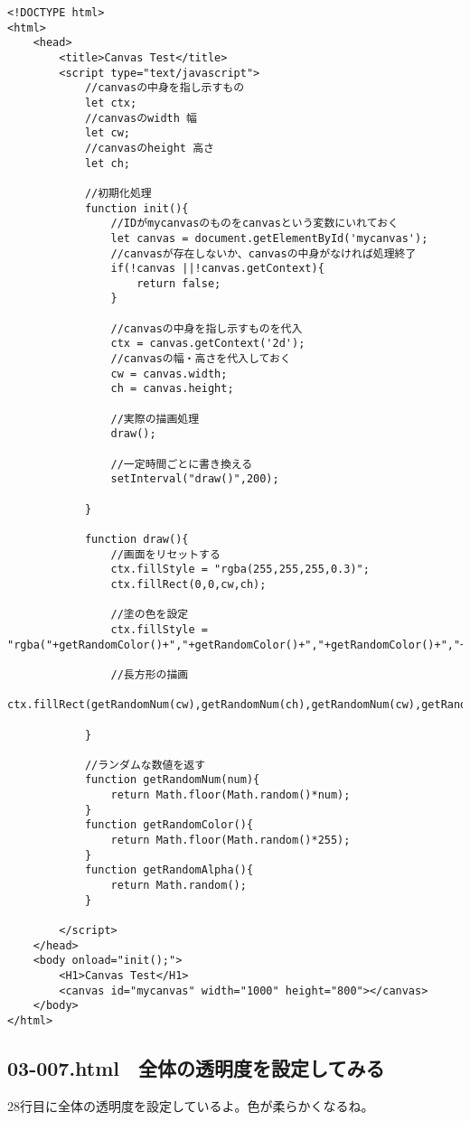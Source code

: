 \documentclass[mingoth,11pt,a4j,uplatex]{jsarticle}
\begin{document}
\begin{lstlisting}[caption=一定時間ごとにランダムな長方形を追加しよう]
<!DOCTYPE html>
<html>
	<head>
		<title>Canvas Test</title>
		<script type="text/javascript">
			//canvasの中身を指し示すもの
			let ctx;
			//canvasのwidth 幅
			let cw;
			//canvasのheight 高さ
			let ch;
			
			//初期化処理
			function init(){
				//IDがmycanvasのものをcanvasという変数にいれておく
				let canvas = document.getElementById('mycanvas');
				//canvasが存在しないか、canvasの中身がなければ処理終了
				if(!canvas ||!canvas.getContext){
					return false;
				}
				
				//canvasの中身を指し示すものを代入
				ctx = canvas.getContext('2d');
				//canvasの幅・高さを代入しておく
				cw = canvas.width;
				ch = canvas.height;
				
				//実際の描画処理
				draw();
				
				//一定時間ごとに書き換える
				setInterval("draw()",200);

			}
			
			function draw(){
				//画面をリセットする
				ctx.fillStyle = "rgba(255,255,255,0.3)";
				ctx.fillRect(0,0,cw,ch);
				
				//塗の色を設定
				ctx.fillStyle = "rgba("+getRandomColor()+","+getRandomColor()+","+getRandomColor()+","+getRandomAlpha()+")";
				
				//長方形の描画
				ctx.fillRect(getRandomNum(cw),getRandomNum(ch),getRandomNum(cw),getRandomNum(ch));

			}
			
			//ランダムな数値を返す
			function getRandomNum(num){
				return Math.floor(Math.random()*num);
			}
			function getRandomColor(){
				return Math.floor(Math.random()*255);
			}
			function getRandomAlpha(){
				return Math.random();
			}

		</script>
	</head>
	<body onload="init();">
		<H1>Canvas Test</H1>
		<canvas id="mycanvas" width="1000" height="800"></canvas>
	</body>
</html>
\end{lstlisting}

\subsection{03-007.html　全体の透明度を設定してみる}
28行目に全体の透明度を設定しているよ。色が柔らかくなるね。
\end{document}
